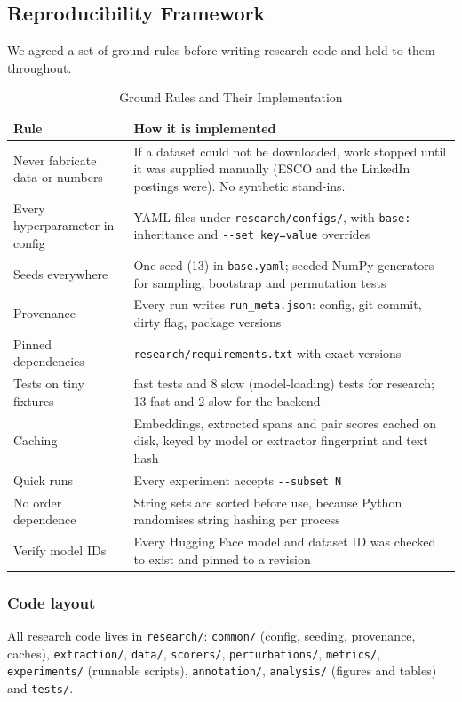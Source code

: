 \documentclass[conference,a4paper]{IEEEtran}
\begin{document}
\subsection{Reproducibility Framework}
We agreed a set of ground rules before writing research code and held to them throughout.

\begin{table}[!t]
\caption{Ground Rules and Their Implementation}
\label{tab:3}
\centering
\footnotesize
\begin{tabularx}{\textwidth}{>{\raggedright\arraybackslash}X>{\raggedright\arraybackslash}X}
\hline
\textbf{Rule} & \textbf{How it is implemented} \\
\hline
Never fabricate data or numbers & If a dataset could not be downloaded, work stopped until it was supplied manually (ESCO and the LinkedIn postings were). No synthetic stand-ins. \\
Every hyperparameter in config & YAML files under \texttt{research/\allowbreak{}configs/\allowbreak{}}, with \texttt{base:} inheritance and \texttt{-\allowbreak{}-\allowbreak{}set key=value} overrides \\
Seeds everywhere & One seed (13) in \texttt{base.\allowbreak{}yaml}; seeded NumPy generators for sampling, bootstrap and permutation tests \\
Provenance & Every run writes \texttt{run\_\allowbreak{}meta.\allowbreak{}json}: config, git commit, dirty flag, package versions \\
Pinned dependencies & \texttt{research/\allowbreak{}requirements.\allowbreak{}txt} with exact versions \\
Tests on tiny fixtures & 236 fast tests and 8 slow (model-loading) tests for research; 13 fast and 2 slow for the backend \\
Caching & Embeddings, extracted spans and pair scores cached on disk, keyed by model or extractor fingerprint and text hash \\
Quick runs & Every experiment accepts \texttt{-\allowbreak{}-\allowbreak{}subset N} \\
No order dependence & String sets are sorted before use, because Python randomises string hashing per process \\
Verify model IDs & Every Hugging Face model and dataset ID was checked to exist and pinned to a revision \\
\hline
\end{tabularx}
\end{table}
\subsubsection{Code layout} All research code lives in \texttt{research/\allowbreak{}}: \texttt{common/\allowbreak{}} (config, seeding, provenance, caches), \texttt{extraction/\allowbreak{}}, \texttt{data/\allowbreak{}}, \texttt{scorers/\allowbreak{}}, \texttt{perturbations/\allowbreak{}}, \texttt{metrics/\allowbreak{}}, \texttt{experiments/\allowbreak{}} (runnable scripts), \texttt{annotation/\allowbreak{}}, \texttt{analysis/\allowbreak{}} (figures and tables) and \texttt{tests/\allowbreak{}}.
\end{document}
